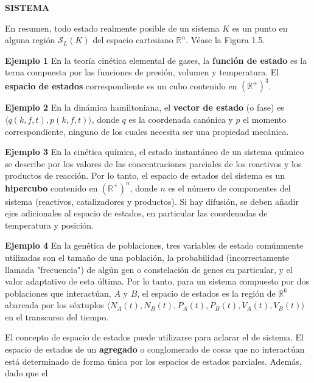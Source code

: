 
\fancyhf{}
\fancyhead[r]{\thepage}
\begin{center}
{\fontsize{13}{16}\selectfont \textbf{SISTEMA}}
\end{center}
\vspace{0.5cm}

{\fontsize{13}{15}\selectfont
En resumen, todo estado realmente posible de un sistema $K$ es un punto en alguna región $\mathcal{S}_L(K)$ del espacio cartesiano $\mathbb{R}^n$. Véase la Figura 1.5.

\textbf{Ejemplo 1} En la teoría cinética elemental de gases, la \textbf{función de estado} es la terna compuesta por las funciones de presión, volumen y temperatura. El \textbf{espacio de estados} correspondiente es un cubo contenido en $(\mathbb{R}^+)^3$.

\textbf{Ejemplo 2} En la dinámica hamiltoniana, el \textbf{vector de estado} (o fase) es $\langle q(k, f, t), p(k, f, t) \rangle$, donde $q$ es la coordenada canónica y $p$ el momento correspondiente, ninguno de los cuales necesita ser una propiedad mecánica.

\textbf{Ejemplo 3} En la cinética química, el estado instantáneo de un sistema químico se describe por los valores de las concentraciones parciales de los reactivos y los productos de reacción. Por lo tanto, el espacio de estados del sistema es un \textbf{hipercubo} contenido en $(\mathbb{R}^+)^n$, donde $n$ es el número de componentes del sistema (reactivos, catalizadores y productos). Si hay difusión, se deben añadir ejes adicionales al espacio de estados, en particular las coordenadas de temperatura y posición.

\textbf{Ejemplo 4} En la genética de poblaciones, tres variables de estado comúnmente utilizadas son el tamaño de una población, la probabilidad (incorrectamente llamada "frecuencia") de algún gen o constelación de genes en particular, y el valor adaptativo de esta última. Por lo tanto, para un sistema compuesto por dos poblaciones que interactúan, $A$ y $B$, el espacio de estados es la región de $\mathbb{R}^6$ abarcada por los séxtuplos $\langle N_A(t), N_B(t), P_A(t), P_B(t), V_A(t), V_B(t) \rangle$ en el transcurso del tiempo.

El concepto de espacio de estados puede utilizarse para aclarar el de sistema. El espacio de estados de un \textbf{agregado} o conglomerado de cosas que no interactúan está determinado de forma única por los espacios de estados parciales. Además, dado que el

}
